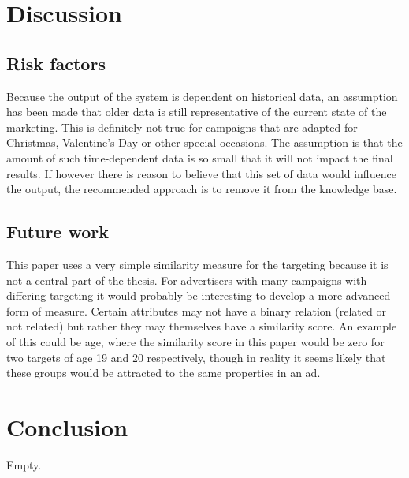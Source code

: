 \documentclass[11pt,a4paper]{report}
\begin{document}
\chapter{Discussion}
\section{Risk factors}
Because the output of the system is dependent on historical data, an assumption has been made that older data is still representative of the current state of the marketing. This is definitely not true for campaigns that are adapted for Christmas, Valentine's Day or other special occasions. The assumption is that the amount of such time-dependent data is so small that it will not impact the final results. If however there is reason to believe that this set of data would influence the output, the recommended approach is to remove it from the knowledge base.

\section{Future work}
This paper uses a very simple similarity measure for the targeting because it is not a central part of the thesis. For advertisers with many campaigns with differing targeting it would probably be interesting to develop a more advanced form of measure. Certain attributes may not have a binary relation (related or not related) but rather they may themselves have a similarity score. An example of this could be age, where the similarity score in this paper would be zero for two targets of age 19 and 20 respectively, though in reality it seems likely that these groups would be attracted to the same properties in an ad.

\chapter{Conclusion}
Empty.

\setspecialhdr

\newpage

\appendix
\setdefaulthdr
%
\end{document}
